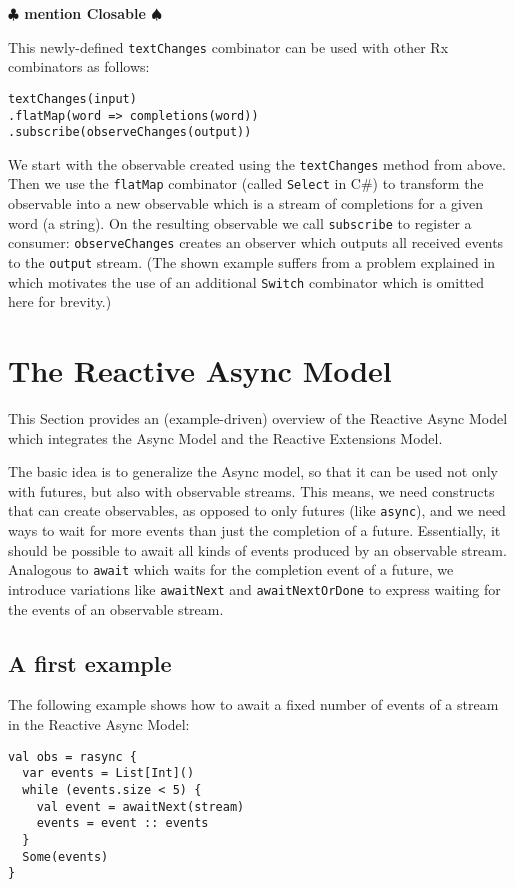 \documentclass{acm_proc_article-sp}
\newcommand{\note}[1]{{\bf $\clubsuit$ #1 $\spadesuit$}}
\begin{document}
\note{mention Closable}

This newly-defined \verb|textChanges| combinator can be used with other Rx
combinators as follows:

\begin{lstlisting}
textChanges(input)
.flatMap(word => completions(word))
.subscribe(observeChanges(output))
\end{lstlisting}

We start with the observable created using the \verb|textChanges| method from
above. Then we use the \verb|flatMap| combinator (called \verb|Select| in C\#)
to transform the observable into a new observable which is a stream of
completions for a given word (a string). On the resulting observable we call
\verb|subscribe| to register a consumer: \verb|observeChanges| creates an
observer which outputs all received events to the \verb|output| stream. (The
shown example suffers from a problem explained in~\cite{RxCACM} which
motivates the use of an additional \verb|Switch| combinator which is omitted
here for brevity.)


\section{The Reactive Async Model}

This Section provides an (example-driven) overview of the Reactive Async Model
which integrates the Async Model and the Reactive Extensions Model.

The basic idea is to generalize the Async model, so that it can be used not
only with futures, but also with observable streams. This means, we need
constructs that can create observables, as opposed to only futures (like
\verb|async|), and we need ways to wait for more events than just the
completion of a future. Essentially, it should be possible to await all kinds
of events produced by an observable stream. Analogous to \verb|await| which
waits for the completion event of a future, we introduce variations like
\verb|awaitNext| and \verb|awaitNextOrDone| to express waiting for the events
of an observable stream.

\subsection{A first example}

The following example shows how to await a fixed number of events of a stream
in the Reactive Async Model:

\begin{lstlisting}
val obs = rasync {
  var events = List[Int]()
  while (events.size < 5) {
    val event = awaitNext(stream)
    events = event :: events
  }
  Some(events)
}
\end{lstlisting}
\end{document}
